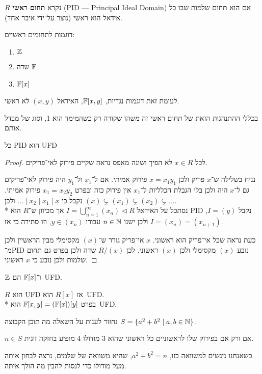 \begin{definition}
	$R$ נקרא \textbf{תחום ראשי} (PID --- Principal Ideal Domain) אם הוא תחום שלמות שבו כל אידאל הוא ראשי (נוצר על־ידי איבר אחד).
\end{definition}
\begin{example}
	דוגמות לתחומים ראשיים:
	\begin{enumerate}
		\item $\mathbb{Z}$
		\item שדה $\mathbb{F}$
		\item $\mathbb{F}[x]$
	\end{enumerate}
	לעומת זאת דוגמות נגדיות, $\mathbb{F}[x, y]$, האידאל $(x, y)$ לא ראשי.
\end{example}
בכללי ההתנהגות הזאת של תחום ראשי זה משהו שקורה רק כשהמימד הוא 1, וסוג של מבדל אותם.
\begin{theorem}
	כל PID הוא UFD
\end{theorem}
\begin{proof}
	לכל $x \in R$ לא הפיך ושונה מאפס נראה שקיים פירוק לאי־פריקים.

	נניח בשלילה ש־$x$ פריק ולכן $x = x_1 y_1$ פירוק אמיתי.
	אם ל־$x_1$ ול־$y_1$ היה פירוק לאי־פריקים גם ל־$x$ היה ולכן בלי הגבלת הכלליות ל־$x_1$ אין פירוק כזה ובפרט $x_1 = x_2 y_2$ פירוק אמיתי.
	נקבל כי $\dots \mid x_2 \mid x_1 \mid x$ ולכן $(x) \subsetneq (x_1) \subsetneq (x_2) \subsetneq \dots$. \\*
	נסתכל על האידאל $I = \bigcup_{n = 1}^\infty (x_n) \triangleleft R$ אך מכיוון ש־$R$ הוא PID נקבל $I = (y)$, ולכן ישנו $n \in \mathbb{N}$ עבורו $y \in (x_n)$,
	וזו סתירה כי אז $I = (x_n) = (x_{n + 1})$.

	כעת נראה שכל אי־פריק הוא ראשוני.
	$x$ אי־פריק גורר ש־$(x)$ מקסימלי מבין הראשיין ולכן מ־PID נובע $(x)$ מקסימלי ולכן $(x)$ ראשוני.
	לכן $R / (x)$ שדה ולכן בפרט גם תחום שלמות ולכן נובע כי $x$ ראשוני.
\end{proof}
\begin{conclusion}
	$\mathbb{Z}$ ו־$\mathbb{F}[x]$ הם~UFD\@.
\end{conclusion}
\begin{theorem}
	$R$ הוא UFD אז $R[x]$ הוא~UFD\@. \\*
	בפרט $\mathbb{F}[x, y] = (\mathbb{F}[x])[y]$ הוא~UFD\@.
\end{theorem}
נחזור לענות על השאלה מה תוכן הקבוצה $S = \{ a^2 + b^2 \mid a, b \in \mathbb{N} \}$.
\begin{theorem}
	$n \in S$ אם ורק אם בפירוק שלו לראשוניים כל ראשוני שהוא 3 מודולו 4 מופיע בחזקה זוגית.
\end{theorem}
כשאנחנו ניגשים למשוואה כזו, $a^2 + b^2 = n$, שהיא משוואה של שלמים, נרצה לבחון אותה מעל מודולו כדי לנסות להבין מה הולך איתה.

